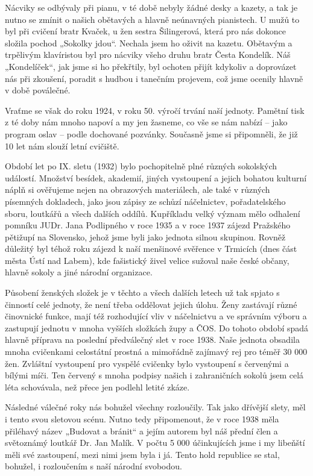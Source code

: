 Nácviky se odbývaly při pianu, v té době nebyly žádné desky a kazety, a
tak je nutno se zmínit o našich obětavých a hlavně neúnavných
pianistech. U mužů to byl při cvičení bratr Kvaček, u žen sestra
Šilingerová, která pro nás dokonce složila pochod „Sokolky jdou``.
Nechala jsem ho oživit na kazetu. Obětavým a trpělivým klavíristou byl
pro nácviky všeho druhu bratr Česta Kondelík. Náš „Kondelíček``, jak
jsme si ho překřtily, byl ochoten přijít kdykoliv a doprovázet nás při
zkoušení, poradit s hudbou i tanečním projevem, což jsme ocenily hlavně
v době poválečné.

Vraťme se však do roku 1924, v roku 50. výročí trvání naší jednoty.
Pamětní tisk z té doby nám mnoho napoví a my jen žasneme, co vše se nám
nabízí -- jako program oslav -- podle dochované pozvánky. Současně jsme
si připomněli, že již 10 let nám slouží letní cvičiště.

Období let po IX. sletu (1932) bylo pochopitelně plné různých sokolských
událostí. Množství besídek, akademií, jiných vystoupení a jejich bohatou
kulturní náplň si ověřujeme nejen na obrazových materiálech, ale také v
různých písemných dokladech, jako jsou zápisy ze schůzí náčelnictev,
pořadatelského sboru, loutkářů a všech dalších oddílů. Kupříkladu velký
význam mělo odhalení pomníku JUDr. Jana Podlipného v roce 1935 a v roce
1937 zájezd Pražského pětižupí na Slovensko, jehož jsme byli jako
jednota silnou skupinou. Rovněž důležitý byl téhož roku zájezd k naší
menšinové svěřence v Trmicích (dnes část města Ústí nad Labem), kde
fašistický živel velice sužoval naše české občany, hlavně sokoly a jiné
národní organizace.

Působení ženských složek je v těchto a všech dalších letech už tak
spjato s činností celé jednoty, že není třeba oddělovat jejich úlohu.
Ženy zastávají různé činovnické funkce, mají též rozhodující vliv v
náčelnictvu a ve správním výboru a zastupují jednotu v mnoha vyšších
složkách župy a ČOS. Do tohoto období spadá hlavně příprava na poslední
předválečný slet v roce 1938. Naše jednota obsadila mnoha cvičenkami
celostátní prostná a mimořádně zajímavý rej pro téměř 30 000 žen.
Zvláštní vystoupení pro vyspělé cvičenky bylo vystoupení s červenými a
bílými míči. Ten červený s mnoha podpisy našich i zahraničních sokolů
jsem celá léta schovávala, než přece jen podlehl letité zkáze.

Následné válečné roky nás bohužel všechny rozloučily. Tak jako dřívější
slety, měl i tento svou sletovou scénu. Nutno tedy připomenout, že v
roce 1938 měla přiléhavý název „Budovat a bránit`` a jejím autorem byl
náš přední člen a světoznámý loutkář Dr. Jan Malík. V počtu 5 000
účinkujících jsme i my libeňští měli své zastoupení, mezi nimi jsem byla
i já. Tento hold republice se stal, bohužel, i rozloučením s naší
národní svobodou.

